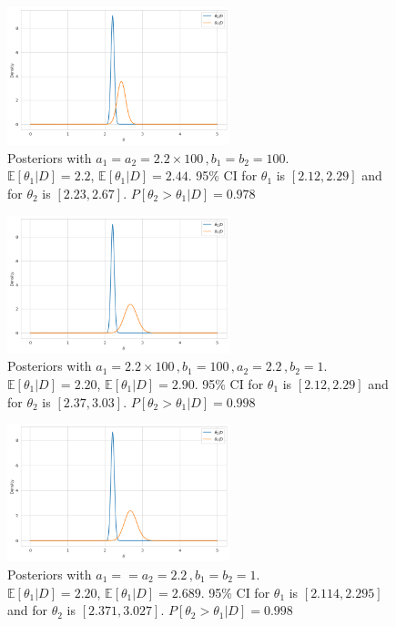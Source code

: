 \documentclass[11pt, letterpaper]{article}
\begin{document}
\begin{figure}[!h]
  \centering
  \includegraphics[width=0.575\textwidth]{4.5.c.1.png}
  \captionsetup{justification=centering}
  \caption{
    Posteriors with $a_1=a_2=2.2\times100\,, b_1=b_2=100$. \\
    $\mathbb{E}[\theta_1|D]=2.2$, $\mathbb{E}[\theta_1|D]=2.44$.
    95\% CI for $\theta_1$ is $[2.12, 2.29]$ and for $\theta_2$ is $[2.23, 2.67]$.
    $P[\theta_2 > \theta_1|D]=0.978$
  }
\end{figure}

\begin{figure}[!h]
  \centering
  \includegraphics[width=0.575\textwidth]{4.5.c.2.png}
  \captionsetup{justification=centering}
  \caption{
    Posteriors with $a_1=2.2\times100\,, b_1=100\,, a_2=2.2\,, b_2=1$. \\
    $\mathbb{E}[\theta_1|D]=2.20$, $\mathbb{E}[\theta_1|D]=2.90$.
    95\% CI for $\theta_1$ is $[2.12, 2.29]$ and for $\theta_2$ is $[2.37, 3.03]$.
    $P[\theta_2 > \theta_1|D]=0.998$
  }
\end{figure}

\begin{figure}[!h]
  \centering
  \includegraphics[width=0.575\textwidth]{4.5.c.3.png}
  \captionsetup{justification=centering}
  \caption{
    Posteriors with $a_1==a_2=2.2\,, b_1=b_2=1$. \\
    $\mathbb{E}[\theta_1|D]=2.20$, $\mathbb{E}[\theta_1|D]=2.689$.
    95\% CI for $\theta_1$ is $[2.114, 2.295]$ and for $\theta_2$ is $[2.371, 3.027]$.
    $P[\theta_2 > \theta_1|D]=0.998$
  }
\end{figure}
\end{document}
